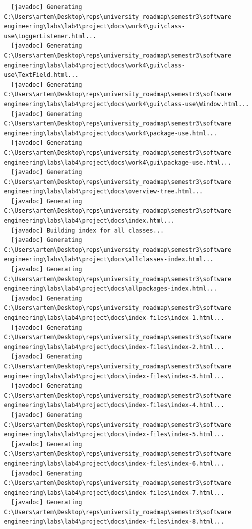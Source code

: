 \documentclass[12pt,a4paper]{article}
\begin{document}
\begin{verbatim}
  [javadoc] Generating C:\Users\artem\Desktop\reps\university_roadmap\semestr3\software engineering\labs\lab4\project\docs\work4\gui\class-use\LoggerListener.html...
  [javadoc] Generating C:\Users\artem\Desktop\reps\university_roadmap\semestr3\software engineering\labs\lab4\project\docs\work4\gui\class-use\TextField.html...
  [javadoc] Generating C:\Users\artem\Desktop\reps\university_roadmap\semestr3\software engineering\labs\lab4\project\docs\work4\gui\class-use\Window.html...
  [javadoc] Generating C:\Users\artem\Desktop\reps\university_roadmap\semestr3\software engineering\labs\lab4\project\docs\work4\package-use.html...
  [javadoc] Generating C:\Users\artem\Desktop\reps\university_roadmap\semestr3\software engineering\labs\lab4\project\docs\work4\gui\package-use.html...
  [javadoc] Generating C:\Users\artem\Desktop\reps\university_roadmap\semestr3\software engineering\labs\lab4\project\docs\overview-tree.html...
  [javadoc] Generating C:\Users\artem\Desktop\reps\university_roadmap\semestr3\software engineering\labs\lab4\project\docs\index.html...
  [javadoc] Building index for all classes...
  [javadoc] Generating C:\Users\artem\Desktop\reps\university_roadmap\semestr3\software engineering\labs\lab4\project\docs\allclasses-index.html...
  [javadoc] Generating C:\Users\artem\Desktop\reps\university_roadmap\semestr3\software engineering\labs\lab4\project\docs\allpackages-index.html...
  [javadoc] Generating C:\Users\artem\Desktop\reps\university_roadmap\semestr3\software engineering\labs\lab4\project\docs\index-files\index-1.html...
  [javadoc] Generating C:\Users\artem\Desktop\reps\university_roadmap\semestr3\software engineering\labs\lab4\project\docs\index-files\index-2.html...
  [javadoc] Generating C:\Users\artem\Desktop\reps\university_roadmap\semestr3\software engineering\labs\lab4\project\docs\index-files\index-3.html...
  [javadoc] Generating C:\Users\artem\Desktop\reps\university_roadmap\semestr3\software engineering\labs\lab4\project\docs\index-files\index-4.html...
  [javadoc] Generating C:\Users\artem\Desktop\reps\university_roadmap\semestr3\software engineering\labs\lab4\project\docs\index-files\index-5.html...
  [javadoc] Generating C:\Users\artem\Desktop\reps\university_roadmap\semestr3\software engineering\labs\lab4\project\docs\index-files\index-6.html...
  [javadoc] Generating C:\Users\artem\Desktop\reps\university_roadmap\semestr3\software engineering\labs\lab4\project\docs\index-files\index-7.html...
  [javadoc] Generating C:\Users\artem\Desktop\reps\university_roadmap\semestr3\software engineering\labs\lab4\project\docs\index-files\index-8.html...

\end{verbatim}
\end{document}
